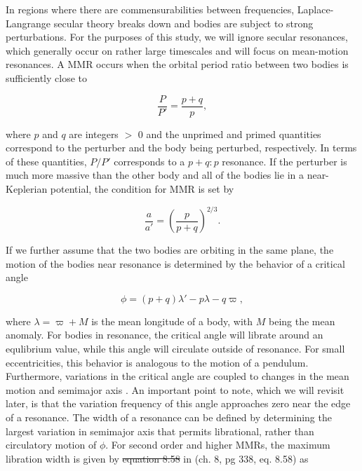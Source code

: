\documentclass[fleqn,usenatbib]{mnras}
\begin{document}
In regions where there are commensurabilities between frequencies, Laplace-Langrange secular theory breaks down and bodies are subject to strong 
perturbations. For the purposes of this study, we will ignore secular resonances, which generally occur on rather large timescales and will focus on 
mean-motion resonances. A MMR occurs  when the orbital period ratio between two bodies is sufficiently close to

\begin{equation}\label{eq:per_mmr}
	\frac{P}{P'} = \frac{p + q}{p},
\end{equation}

\noindent where  $p$ and $q$ are integers $>$ 0 and the unprimed and primed quantities correspond to the perturber and the body being perturbed, 
respectively. In terms of these quantities, $P/P'$ corresponds to a $p+q:p$ resonance. If the perturber is much more massive than the other body and all of the 
bodies lie in a near-Keplerian potential, the condition for MMR is set by

\begin{equation}\label{eq:a_mmr}
	\frac{a}{a'} = \left( \frac{p}{p + q} \right)^{2/3}.
\end{equation}

If we further assume that the two bodies are orbiting in the same plane, the motion of the bodies near resonance is determined by the
behavior of a critical angle

\begin{equation}\label{eq:phi_crit}
	\phi = (p + q) \lambda' - p \lambda - q \varpi,
\end{equation}

\noindent where $\lambda = \varpi + M$ is the mean longitude of a
body, with $M$ being the mean anomaly. For bodies in resonance, the critical angle will librate around an 
equlibrium value, while this angle will circulate outside of resonance. For small eccentricities, this behavior is analogous to the motion of a 
pendulum. Furthermore, variations in the critical angle are coupled to changes in the mean motion and semimajor axis \citep{1999ssd..book.....M}. An important 
point to note, which we will revisit later, is that the variation frequency of this angle approaches zero near the edge of a resonance. The 
width of a resonance can be defined by determining the largest variation in semimajor axis that permits librational, rather than circulatory motion of $\phi$. For 
second order and higher MMRs, the maximum libration width is given by \sout{equation 8.58} in \citet{1999ssd..book.....M} (ch. 8, pg 338, eq. 8.58) as
\end{document}
